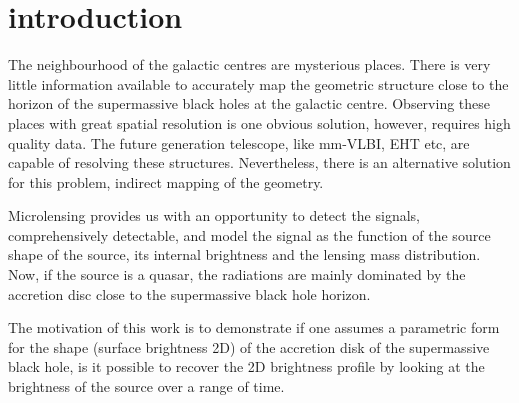 \section{introduction}
The neighbourhood of the galactic centres are mysterious places. There is very little information available to accurately map the geometric structure close to the horizon of the supermassive black holes at the galactic centre. Observing these places with great spatial resolution is one obvious solution, however, requires high quality data. The future generation telescope, like mm-VLBI, EHT etc, are capable of resolving these structures. Nevertheless, there is an alternative solution for this problem, indirect mapping of the geometry. 

Microlensing provides us with an opportunity to detect the signals, comprehensively detectable, and model the signal as the function of the source shape of the source, its internal brightness and the lensing mass distribution. Now, if the source is a quasar, the radiations are mainly dominated by the accretion disc close to the supermassive black hole horizon.

The motivation of this work is to demonstrate if one assumes a parametric form for the shape (surface brightness 2D) of the accretion disk of the supermassive black hole, is it possible to recover the 2D brightness profile by looking at the brightness of the source over a range of time.
